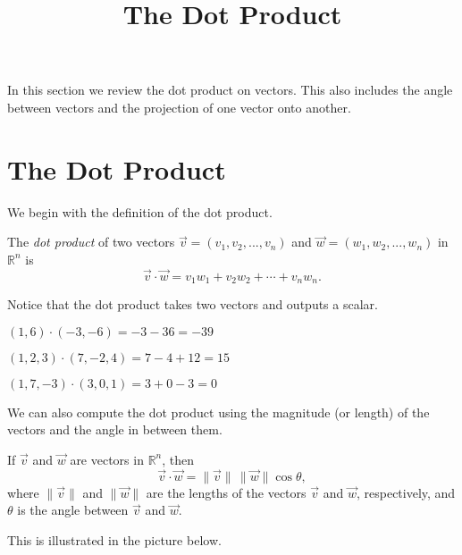 \documentclass{ximera}
\title{The Dot Product}
\begin{document}
  
\begin{abstract}  
\end{abstract}  
\maketitle 

In this section we review the dot product on vectors. This also includes the angle between vectors and the projection of one vector onto another.

\section{The Dot Product}

We begin with the definition of the dot product.

\begin{definition}
The \emph{dot product} of two vectors $\vec{v} = (v_1,v_2,...,v_n)$ and $\vec{w} = (w_1,w_2,...,w_n)$ in $\mathbb{R}^n$ is
\[
\vec{v}\cdot\vec{w} = v_1w_1+v_2w_2+\cdots + v_nw_n.
\]
\end{definition}

Notice that the dot product takes two vectors and outputs a scalar.

\begin{example}
$(1,6)\cdot (-3,-6) = -3-36=-39$

$(1,2,3)\cdot (7,-2,4) = 7-4+12=15$

$(1,7,-3)\cdot (3,0,1) = 3+0-3=0$
\end{example}

We can also compute the dot product using the magnitude (or length) of the vectors and the angle in between them.

\begin{proposition}
If $\vec{v}$ and $\vec{w}$ are vectors in $\mathbb{R}^n$, then
\[
\vec{v}\cdot\vec{w} = \|\vec{v}\|\,\|\vec{w}\|\cos\theta,
\]
where $\|\vec{v}\|$ and $\|\vec{w}\|$ are the lengths of the vectors $\vec{v}$ and $\vec{w}$, respectively, and $\theta$ is the angle between $\vec{v}$ and $\vec{w}$.
\end{proposition}

This is illustrated in the picture below.

\begin{image}
\end{image}
\end{document}
